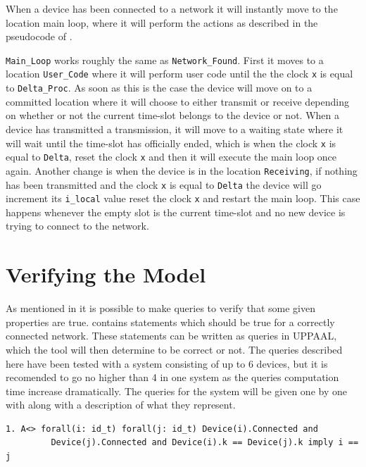 When a device has been connected to a network it will instantly move to the location main loop, where it will perform the actions as described in the pseudocode of .

\texttt{Main\_Loop} works roughly the same as \texttt{Network\_Found}.
First it moves to a location \texttt{User\_Code} where it will perform user code until the the clock \texttt{x} is equal to \texttt{Delta\_Proc}.
As soon as this is the case the device will move on to a committed location where it will choose to either transmit or receive depending on whether or not the current time-slot belongs to the device or not.
When a device has transmitted a transmission, it will move to a waiting state where it will wait until the time-slot has officially ended, which is when the clock \texttt{x} is equal to \texttt{Delta}, reset the clock \texttt{x} and then it will execute the main loop once again.
Another change is when the device is in the location \texttt{Receiving}, if nothing has been transmitted and the clock \texttt{x} is equal to \texttt{Delta} the device will go increment its \texttt{i\_local} value reset the clock \texttt{x} and restart the main loop. 
This case happens whenever the empty slot is the current time-slot and no new device is trying to connect to the network.

\section{Verifying the Model}

As mentioned in  it is possible to make queries to verify that some given properties are true.
 contains statements which should be true for a correctly connected network.
These statements can be written as queries in UPPAAL, which the tool will then determine to be correct or not. 
The queries described here have been tested with a system consisting of up to 6 devices, but it is recomended to go no higher than 4 in one system as the queries computation time increase dramatically.
The queries for the system will be given one by one with along with a description of what they represent.
\begin{lstlisting}[language={[GUI]Uppaal}, % use GUI flavor
columns={[l]flexible},
frameround=fftt, frame=shadowbox, rulesepcolor=\color{gray}, title={This means that eventually it will be true that all devices are connected, and if two devices have the same time-slot k for as their own, it means it is the same device. }]
1. A<> forall(i: id_t) forall(j: id_t) Device(i).Connected and
		 Device(j).Connected and Device(i).k == Device(j).k imply i == j
\end{lstlisting}


